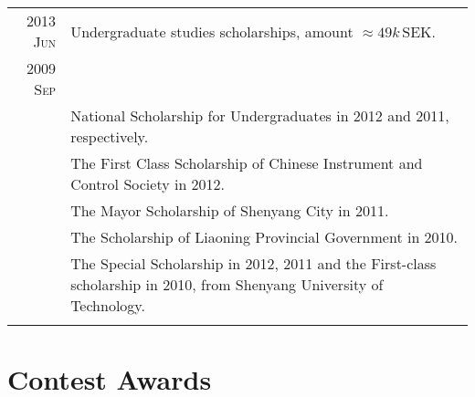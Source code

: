 \documentclass[a4paper,10pt]{article}
\begin{document}
\begin{savenotes}
\begin{longtable}{r|p{13cm}}
    \textsc{2013 Jun}	& Undergraduate studies scholarships, amount $\approx 49k\,\mathrm {SEK}$.\\
    \textsc{2009 Sep}	& \\
      & National Scholarship for Undergraduates in 2012 and 2011, respectively.\\
      & The First Class Scholarship of Chinese Instrument and Control Society in 2012.\\
      & The Mayor Scholarship of Shenyang City in 2011.\\
      & The Scholarship of Liaoning Provincial Government in 2010.\\
      & The Special Scholarship in 2012, 2011 and the First-class scholarship in 2010, from Shenyang University of Technology.\\
    \multicolumn{2}{c}{} \\

  \end{longtable}
\end{savenotes}

\section{Contest Awards}
\end{document}
